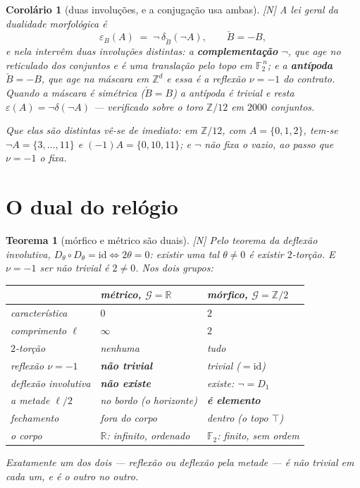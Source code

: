 \documentclass[12pt,a4paper]{article}
\newcommand{\RR}{\mathbb{R}}
\newcommand{\ZZ}{\mathbb{Z}}
\newcommand{\FF}{\mathbb{F}_2}
\newcommand{\GG}{\mathcal{G}}
\newcommand{\est}[1]{\textsf{\footnotesize[#1]}}
\newtheorem{teorema}[definicao]{Teorema}
\newtheorem{corolario}[definicao]{Corolário}
\begin{document}
\begin{corolario}[duas involuções, e a conjugação usa ambas]\label{cor:conjuga}
\est{N} A lei geral da dualidade morfológica é
\[
\varepsilon_B(A)\;=\;\neg\,\delta_{\check B}(\neg A),
\qquad \check B=-B ,
\]
e nela intervêm \emph{duas} involuções distintas: a \textbf{complementação} $\neg$, que age no reticulado dos
conjuntos e é uma translação pelo topo em $\FF^{\,n}$; e a \textbf{antípoda} $\check B=-B$, que age na máscara em
$\ZZ^d$ e \emph{essa} é a reflexão $\nu=-1$ do contrato. Quando a máscara é simétrica ($\check B=B$) a antípoda é
trivial e resta $\varepsilon(A)=\neg\delta(\neg A)$ --- verificado sobre o toro $\ZZ/12$ em $2000$ conjuntos.

\noindent Que elas são distintas vê-se de imediato: em $\ZZ/12$, com $A=\{0,1,2\}$, tem-se
$\neg A=\{3,\dots,11\}$ e $(-1)A=\{0,10,11\}$; e $\neg$ não fixa o vazio, ao passo que $\nu=-1$ o fixa.
\end{corolario}

\section{O dual do relógio}

\begin{teorema}[mórfico e métrico são duais]\label{teo:dualmetrico}
\est{N} Pelo teorema da deflexão involutiva, $D_\theta\circ D_\theta=\mathrm{id}\iff2\theta=0$: existir uma tal
$\theta\neq0$ \emph{é} existir $2$-torção. E $\nu=-1$ ser não trivial \emph{é} $2\neq0$. Nos dois grupos:
\begin{center}
\renewcommand{\arraystretch}{1.3}
\begin{tabular}{lll}
\hline
& \textbf{métrico}, $\GG=\RR$ & \textbf{mórfico}, $\GG=\ZZ/2$\\
\hline
característica & $0$ & $2$\\
comprimento $\ell$ & $\infty$ & $2$\\
$2$-torção & nenhuma & tudo\\
reflexão $\nu=-1$ & \textbf{não trivial} & trivial ($=\mathrm{id}$)\\
deflexão involutiva & \textbf{não existe} & existe: $\neg=D_1$\\
a metade $\ell/2$ & no bordo (o horizonte) & \textbf{é elemento}\\
fechamento & fora do corpo & dentro (o topo $\top$)\\
o corpo & $\RR$: infinito, ordenado & $\FF$: finito, sem ordem\\
\hline
\end{tabular}
\end{center}
\emph{Exatamente um dos dois --- reflexão ou deflexão pela metade --- é não trivial em cada um, e é o outro no
outro.}
\end{teorema}
\end{document}
